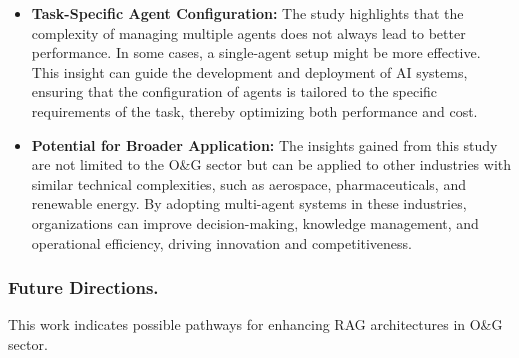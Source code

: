 \begin{itemize}
                    \item \textbf{Task-Specific Agent Configuration:}
                        The study highlights that the complexity of managing multiple agents does not always lead to better performance. In some cases, a single-agent setup might be more effective.
                        This insight can guide the development and deployment of AI systems, ensuring that the configuration of agents is tailored to the specific requirements of the task, thereby optimizing both performance and cost.           
                        
                    \item \textbf{Potential for Broader Application:}
                        The insights gained from this study are not limited to the O\&G sector but can be applied to other industries with similar technical complexities, such as aerospace, pharmaceuticals, and renewable energy.
                        By adopting multi-agent systems in these industries, organizations can improve decision-making, knowledge management, and operational efficiency, driving innovation and competitiveness.             
                    
                \end{itemize}
                        
                    
            \subsubsection{Future Directions.} 

                This work indicates possible pathways for enhancing RAG architectures in O\&G sector. 
                
